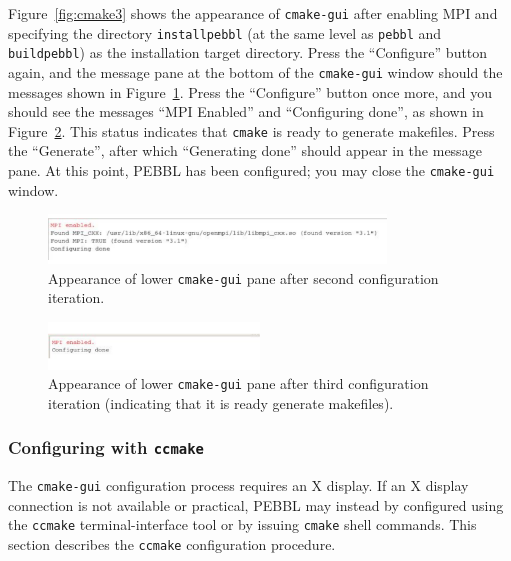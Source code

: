 Figure~\ref{fig:cmake3} shows the appearance of \texttt{cmake-gui} after
enabling MPI and specifying the directory \texttt{installpebbl} (at the same level as
\texttt{pebbl} and \texttt{buildpebbl}) as the installation target directory.
Press the ``Configure'' button again, and the message pane at the bottom of
the \texttt{cmake-gui} window should the messages shown in
Figure~\ref{fig:cmake4}.  Press the ``Configure'' button once more, and you
should see the messages ``MPI Enabled'' and ``Configuring done'', as shown in
Figure~\ref{fig:cmake5}.  This status indicates that \texttt{cmake} is ready
to generate makefiles.  Press the ``Generate'', after which ``Generating
done'' should appear in the message pane.  At this point, PEBBL has been
configured; you may close the \texttt{cmake-gui} window.

\begin{figure}[tpb]
\begin{center}
\includegraphics[width=0.8\textwidth]{cmake4}
\vspace{-0.3in}
\end{center}{}
\caption{Appearance of lower \texttt{cmake-gui} pane after second
configuration iteration.
  \label{fig:cmake4}}
\end{figure}

\begin{figure}[tpb]
\begin{center}
\includegraphics[width=0.5\textwidth]{cmake5.pdf}
\vspace{-0.3in}
\end{center}{}
\caption{Appearance of lower \texttt{cmake-gui} pane after third
configuration iteration (indicating that it is ready generate makefiles).
  \label{fig:cmake5}}
\end{figure}

\subsubsection{Configuring with \texttt{ccmake}}
The \texttt{cmake-gui} configuration process requires an X display.  If an X
display connection is not available or practical, PEBBL may instead by
configured using the \texttt{ccmake} terminal-interface tool or by issuing
\texttt{cmake} shell commands.  This section describes the \texttt{ccmake}
configuration procedure.

